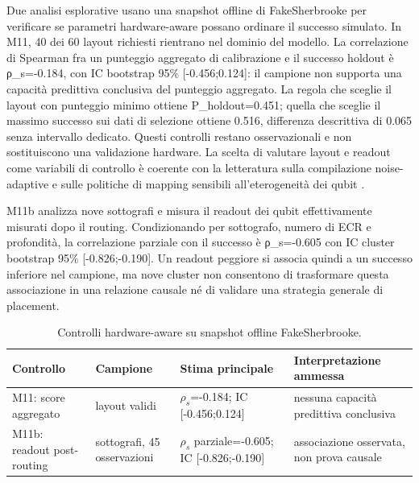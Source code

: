 Due analisi esplorative usano una snapshot offline di FakeSherbrooke per verificare se parametri hardware-aware possano ordinare il successo simulato. In M11, 40 dei 60 layout richiesti rientrano nel dominio del modello. La correlazione di Spearman fra un punteggio aggregato di calibrazione e il successo holdout è ρ\_s=-0.184, con IC bootstrap 95\% {[}-0.456;0.124{]}: il campione non supporta una capacità predittiva conclusiva del punteggio aggregato. La regola che sceglie il layout con punteggio minimo ottiene P\_holdout=0.451; quella che sceglie il massimo successo sui dati di selezione ottiene 0.516, differenza descrittiva di 0.065 senza intervallo dedicato. Questi controlli restano osservazionali e non sostituiscono una validazione hardware. La scelta di valutare layout e readout come variabili di controllo è coerente con la letteratura sulla compilazione noise-adaptive e sulle politiche di mapping sensibili all'eterogeneità dei qubit \cite{murali2019,tannu2019}.

M11b analizza nove sottografi e misura il readout dei qubit effettivamente misurati dopo il routing. Condizionando per sottografo, numero di ECR e profondità, la correlazione parziale con il successo è ρ\_s=-0.605 con IC cluster bootstrap 95\% {[}-0.826;-0.190{]}. Un readout peggiore si associa quindi a un successo inferiore nel campione, ma nove cluster non consentono di trasformare questa associazione in una relazione causale né di validare una strategia generale di placement.

\begingroup
\small
\begin{table}[!htbp]
\centering
\small

\begin{tabular}{@{}
  >{\raggedright\arraybackslash}p{}
  >{\raggedright\arraybackslash}p{}
  >{\raggedright\arraybackslash}p{}
  >{\raggedright\arraybackslash}p{}@{}}
\toprule
\textbf{Controllo} & \textbf{Campione} & \textbf{Stima principale} & \textbf{Interpretazione ammessa} \\
\midrule
M11: score aggregato & 40 layout validi & $\rho_s$=-0.184; IC {[}-0.456;0.124{]} & nessuna capacità predittiva conclusiva \\
\addlinespace[0.3em]
M11b: readout post-routing & 9 sottografi, 45 osservazioni & $\rho_s$ parziale=-0.605; IC {[}-0.826;-0.190{]} & associazione osservata, non prova causale \\
\bottomrule
\end{tabular}
\caption{Controlli hardware-aware su snapshot offline FakeSherbrooke.}\label{tab:finale_5_21}

\end{table}
\endgroup

